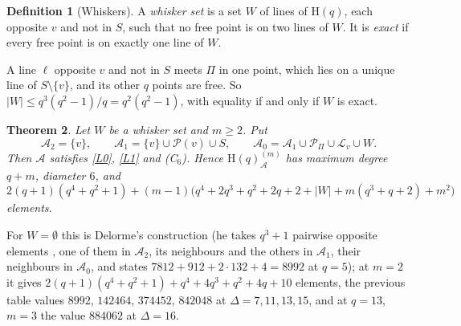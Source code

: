 \documentclass[11pt]{amsart}
\newtheorem{theorem}{Theorem}[section]
\theoremstyle{definition}
\newtheorem{definition}[theorem]{Definition}
\theoremstyle{remark}
\newcommand{\cP}{\mathcal{P}}
\newcommand{\cL}{\mathcal{L}}
\newcommand{\cA}{\mathcal{A}}
\newcommand{\Hq}{\mathrm{H}}
\newcommand{\Dbl}[2]{{#1}^{(#2)}_{\cA}}
\begin{document}
\begin{definition}[Whiskers]
A \emph{whisker set} is a set $W$ of lines of $\Hq(q)$, each opposite $v$ and not in $S$, such that no free point is on two lines of $W$. It is \emph{exact} if every free point is on exactly one line of $W$.
\end{definition}

A line $\ell$ opposite $v$ and not in $S$ meets $\Pi$ in one point, which lies on a unique line of $S\setminus\{v\}$, and its other $q$ points are free. So $|W|\le q^3(q^2-1)/q=q^2(q^2-1)$, with equality if and only if $W$ is exact.

\begin{theorem}\label{thm:whisk}
Let $W$ be a whisker set and $m\ge2$. Put
\[
\cA_2=\{v\},\qquad \cA_1=\{v\}\cup\cP(v)\cup S,\qquad \cA_0=\cA_1\cup\cP_\Pi\cup\cL_v\cup W .
\]
Then $\cA$ satisfies \ref{L0}, \ref{L1} and \textup{(C$_6$)}. Hence $\Dbl{\Hq(q)}{m}$ has maximum degree $q+m$, diameter $6$, and
\[
2(q+1)(q^4+q^2+1)+(m-1)\bigl(q^4+2q^3+q^2+2q+2+|W|+m(q^3+q+2)+m^2\bigr)
\]
elements.
\end{theorem}

For $W=\emptyset$ this is Delorme's construction \cite[\S8(b)]{D85a} (he takes $q^3+1$ pairwise opposite elements \cite{T80}, one of them in $\cA_2$, its neighbours and the others in $\cA_1$, their neighbours in $\cA_0$, and states $7812+912+2\cdot132+4=8992$ at $q=5$); at $m=2$ it gives $2(q+1)(q^4+q^2+1)+q^4+4q^3+q^2+4q+10$ elements, the previous table values $8992$, $142464$, $374452$, $842048$ at $\Delta=7,11,13,15$, and at $q=13$, $m=3$ the value $884062$ at $\Delta=16$.
\end{document}
